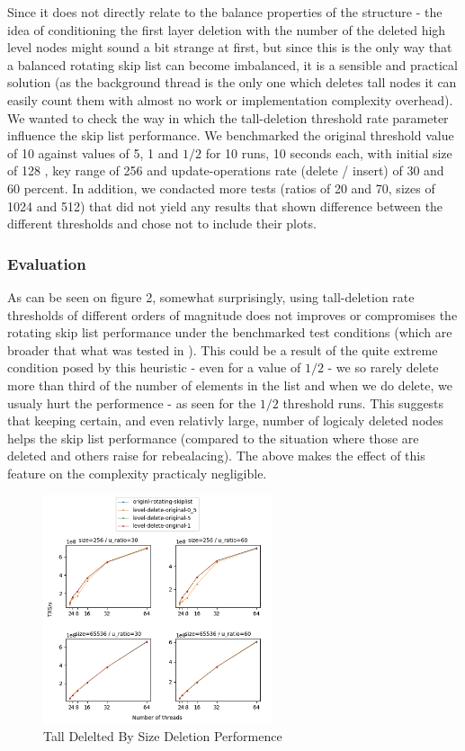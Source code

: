 \documentclass{article}
\begin{document}
Since it does not directly relate to the balance properties of the structure - the idea of conditioning the first layer deletion with the number of the deleted high level nodes might sound a bit strange at first, but since this is the only way that a balanced rotating skip list can become imbalanced, it is a sensible and practical solution (as the background thread is the only one which deletes tall nodes it can easily count them with almost no work or implementation complexity overhead). We wanted to check the way in which the tall-deletion threshold rate parameter influence the skip list performance. We benchmarked the original threshold value of 10 against values of 5, 1 and $1/2$ for 10 runs, 10 seconds each, with initial size of 128 , key range of 256 and update-operations rate (delete / insert) of 30 and 60 percent. In addition, we condacted more tests (ratios of 20 and 70, sizes of 1024 and 512) that did not yield any results that shown difference between the different thresholds and chose not to include their plots.

\subsubsection{Evaluation}
\label{sssec:tds-evl}

As can be seen on figure 2, somewhat surprisingly, using tall-deletion rate thresholds of different orders of magnitude does not improves or compromises the rotating skip list performance under the benchmarked test conditions (which are broader that what was tested in \cite{C1}). This could be a result of the quite extreme condition posed by this heuristic - even for a value of $1/2$ - we so rarely delete more than third of the number of elements in the list and when we do delete, we usualy hurt the performence - as seen for the $1/2$ threshold runs. This suggests that keeping certain, and even relativly large, number of logicaly deleted nodes helps the skip list performance (compared to the situation where those are deleted and others raise for rebealacing). The above makes the effect of this feature on the complexity practicaly negligible.

\begin{figure}
	\caption{Tall Delelted By Size Deletion Performence}
	\centering
	\includegraphics[width=0.6\textwidth]{level-delete-original_plot}
\end{figure}
\end{document}
